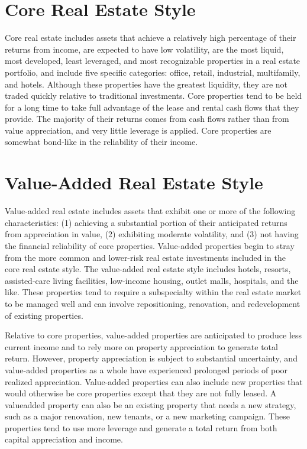 \documentclass[11pt]{article}
\begin{document}
\section*{Core Real Estate Style}
Core real estate includes assets that achieve a relatively high percentage of their returns from income, are expected to have low volatility, are the most liquid, most developed, least leveraged, and most recognizable properties in a real estate portfolio, and include five specific categories: office, retail, industrial, multifamily, and hotels. Although these properties have the greatest liquidity, they are not traded quickly relative to traditional investments. Core properties tend to be held for a long time to take full advantage of the lease and rental cash flows that they provide. The majority of their returns comes from cash flows rather than from value appreciation, and very little leverage is applied. Core properties are somewhat bond-like in the reliability of their income.

\section*{Value-Added Real Estate Style}
Value-added real estate includes assets that exhibit one or more of the following characteristics: (1) achieving a substantial portion of their anticipated returns from appreciation in value, (2) exhibiting moderate volatility, and (3) not having the financial reliability of core properties. Value-added properties begin to stray from the more common and lower-risk real estate investments included in the core real estate style. The value-added real estate style includes hotels, resorts, assisted-care living facilities, low-income housing, outlet malls, hospitals, and the like. These properties tend to require a subspecialty within the real estate market to be managed well and can involve repositioning, renovation, and redevelopment of existing properties.

Relative to core properties, value-added properties are anticipated to produce less current income and to rely more on property appreciation to generate total return. However, property appreciation is subject to substantial uncertainty, and value-added properties as a whole have experienced prolonged periods of poor realized appreciation. Value-added properties can also include new properties that would otherwise be core properties except that they are not fully leased. A valueadded property can also be an existing property that needs a new strategy, such as a major renovation, new tenants, or a new marketing campaign. These properties tend to use more leverage and generate a total return from both capital appreciation and income.
\end{document}
